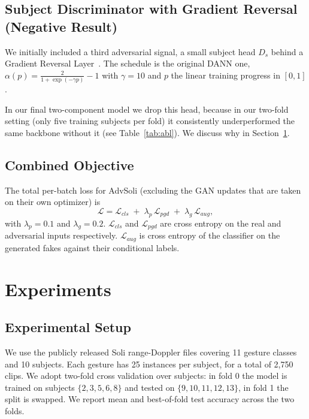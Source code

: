 \documentclass[10pt,twocolumn,letterpaper]{article}
\begin{document}
\subsection{Subject Discriminator with Gradient Reversal (Negative Result)}
\label{sec:dann}
We initially included a third adversarial signal, a small subject head
$D_s$ behind a Gradient Reversal Layer~\cite{ganin2015dann}. The
schedule is the original DANN one,
$\alpha(p) = \frac{2}{1+\exp(-\gamma p)} - 1$ with $\gamma{=}10$ and
$p$ the linear training progress in $[0,1]$.

In our final two-component model we drop this head, because in our
two-fold setting (only five training subjects per fold) it consistently
underperformed the same backbone without it (see
Table~\ref{tab:abl}). We discuss why in Section~\ref{sec:exp}.

\subsection{Combined Objective}
\label{sec:loss}
The total per-batch loss for AdvSoli (excluding the GAN updates that
are taken on their own optimizer) is
\begin{equation}
\mathcal{L} = \mathcal{L}_{cls} \;+\; \lambda_p\,\mathcal{L}_{pgd} \;+\; \lambda_g\,\mathcal{L}_{aug},
\label{eq:total}
\end{equation}
with $\lambda_p{=}0.1$ and $\lambda_g{=}0.2$. $\mathcal{L}_{cls}$ and
$\mathcal{L}_{pgd}$ are cross entropy on the real and adversarial inputs
respectively. $\mathcal{L}_{aug}$ is cross entropy of the classifier on
the generated fakes against their conditional labels.

\section{Experiments}
\label{sec:exp}

\subsection{Experimental Setup}
We use the publicly released Soli range-Doppler files
\cite{wang2016interacting} covering 11 gesture classes and 10 subjects.
Each gesture has 25 instances per subject, for a total of 2,750 clips.
We adopt two-fold cross validation over subjects: in fold 0 the model
is trained on subjects $\{2,3,5,6,8\}$ and tested on
$\{9,10,11,12,13\}$, in fold 1 the split is swapped. We report mean and
best-of-fold test accuracy across the two folds.
\end{document}
